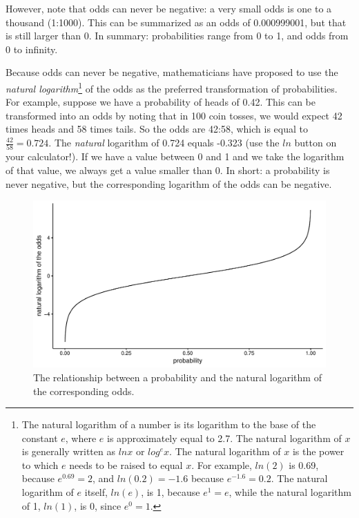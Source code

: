 \documentclass[]{book}\usepackage[]{graphicx}\usepackage[]{color}
\makeatletter
\def\maxwidth{ %
  \ifdim\Gin@nat@width>\linewidth
    \linewidth
  \else
    \Gin@nat@width
  \fi
}
\newenvironment{knitrout}{}{} %
\makeatother
\begin{document}
However, note that odds can never be negative: a very small odds is one to a thousand (1:1000). This can be summarized as an odds of 0.000999001, but that is still larger than 0. In summary: probabilities range from 0 to 1, and odds from 0 to infinity.

Because odds can never be negative, mathematicians have proposed to use the \textit{natural logarithm}\footnote{The natural logarithm of a number is its logarithm to the base of the constant $e$, where $e$ is approximately equal to 2.7. The natural logarithm of $x$ is generally written as
$ln x$ or $log^e x$. The natural logarithm of $x$ is the power to which $e$ needs to be raised to equal $x$. For example, $ln(2)$ is 0.69, because $e^{0.69} = 2$, and $ln(0.2)=-1.6$ because $e^{-1.6}=0.2$. The natural logarithm of $e$ itself, $ln(e)$, is 1, because $e^1 = e$, while the natural logarithm of 1, $ln(1)$, is 0, since $e^0 = 1$.} of the odds  as the preferred transformation of probabilities. For example, suppose we have a probability of heads of 0.42. This can be transformed into an odds by noting that in 100 coin tosses, we would expect 42 times heads and 58 times tails. So the odds are 42:58, which is equal to $\frac{42}{58}=0.724$. The \textit{natural} logarithm of 0.724 equals -0.323 (use the $ln$ button on your calculator!). If we have a value between 0 and 1 and we take the logarithm of that value, we always get a value smaller than 0. In short: a probability is never negative, but the corresponding logarithm of the odds can be negative.




\begin{knitrout}
\color{fgcolor}\begin{figure}

{\centering \includegraphics[width=\maxwidth]{figure/gen_8-1} 

}

\caption[The relationship between a probability and the natural logarithm of the corresponding odds]{The relationship between a probability and the natural logarithm of the corresponding odds.}\label{fig:gen_8}
\end{figure}


\end{knitrout}
\end{document}
